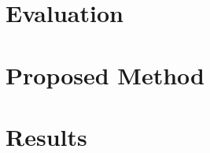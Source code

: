 \begin{comment}
ChatGPT on article-level representations
Word Embeddings: Techniques like Word2Vec, GloVe, or FastText can convert words into numerical vectors, capturing semantic relationships between them. For an article representation, averaging or pooling these word vectors can create a simple yet effective representation.

Doc2Vec: Models like Doc2Vec extend word embeddings to whole documents, assigning each document a unique vector representation. This captures document-level semantics and context.

TF-IDF: Term Frequency-Inverse Document Frequency represents the importance of a word in a document relative to a collection of documents. It gives weight to words based on their frequency in the document and their rarity in the corpus.

BERT and Transformers: Models like BERT utilize transformer architectures to create contextualized word embeddings. By considering the context of words in a sentence, these models generate representations that capture nuanced meanings.

Graph-based Representations: Representing articles as nodes in a graph where edges signify relationships (such as co-citations or topic similarities) can offer a comprehensive representation.

Topic Modeling: Techniques like Latent Dirichlet Allocation (LDA) or Non-Negative Matrix Factorization (NMF) can help in extracting underlying topics from the articles, creating representations based on these topics' distributions.

P.S. from ChatGPT -> For very long documents, downsampling or breaking the article into manageable chunks might be necessary to fit into memory or improve model performance.
\end{comment}


\section{Evaluation}

\section{Proposed Method}

\section{Results}


